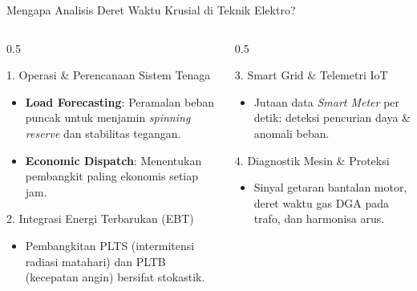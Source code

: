 \documentclass[aspectratio=169, 10pt]{beamer}
\begin{document}
\begin{frame}{Mengapa Analisis Deret Waktu Krusial di Teknik Elektro?}
    \begin{columns}[T]
        \begin{column}{0.5\textwidth}
            \begin{block}{1. Operasi \& Perencanaan Sistem Tenaga}
                \begin{itemize}
                    \item \textbf{Load Forecasting}: Peramalan beban puncak untuk menjamin \textit{spinning reserve} dan stabilitas tegangan.
                    \item \textbf{Economic Dispatch}: Menentukan pembangkit paling ekonomis setiap jam.
                \end{itemize}
            \end{block}
            \begin{block}{2. Integrasi Energi Terbarukan (EBT)}
                \begin{itemize}
                    \item Pembangkitan PLTS (intermitensi radiasi matahari) dan PLTB (kecepatan angin) bersifat stokastik.
                \end{itemize}
            \end{block}
        \end{column}
        \begin{column}{0.5\textwidth}
            \begin{block}{3. Smart Grid \& Telemetri IoT}
                \begin{itemize}
                    \item Jutaan data \textit{Smart Meter} per detik: deteksi pencurian daya \& anomali beban.
                \end{itemize}
            \end{block}
            \begin{block}{4. Diagnostik Mesin \& Proteksi}
                \begin{itemize}
                    \item Sinyal getaran bantalan motor, deret waktu gas DGA pada trafo, dan harmonisa arus.
                \end{itemize}
            \end{block}
        \end{column}
    \end{columns}
\end{frame}
\end{document}
